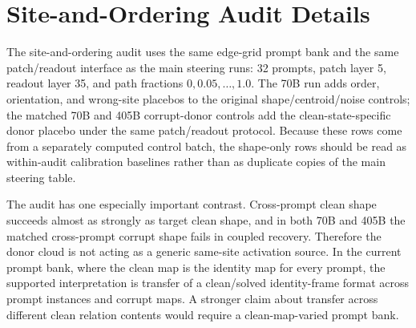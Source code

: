 \documentclass[11pt]{article}
\begin{document}
\section{Site-and-Ordering Audit Details}

The site-and-ordering audit uses the same edge-grid prompt bank and the same patch/readout interface as the main steering runs: 32 prompts, patch layer 5, readout layer 35, and path fractions $0,0.05,\ldots,1.0$. The 70B run adds order, orientation, and wrong-site placebos to the original shape/centroid/noise controls; the matched 70B and 405B corrupt-donor controls add the clean-state-specific donor placebo under the same patch/readout protocol. Because these rows come from a separately computed control batch, the shape-only rows should be read as within-audit calibration baselines rather than as duplicate copies of the main steering table.

The audit has one especially important contrast. Cross-prompt clean shape succeeds almost as strongly as target clean shape, and in both 70B and 405B the matched cross-prompt corrupt shape fails in coupled recovery. Therefore the donor cloud is not acting as a generic same-site activation source. In the current prompt bank, where the clean map is the identity map for every prompt, the supported interpretation is transfer of a clean/solved identity-frame format across prompt instances and corrupt maps. A stronger claim about transfer across different clean relation contents would require a clean-map-varied prompt bank.
\end{document}
